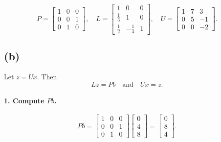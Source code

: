 \documentclass{article}
\begin{document}
$$
    \boxed{
        P =
        \begin{bmatrix}
            1 & 0 & 0 \\
            0 & 0 & 1 \\
            0 & 1 & 0
        \end{bmatrix},
        \quad
        L =
        \begin{bmatrix}
            1        & 0         & 0 \\
            \tfrac13 & 1         & 0 \\
            \tfrac12 & -\tfrac14 & 1
        \end{bmatrix},
        \quad
        U =
        \begin{bmatrix}
            1 & 7 & 3  \\
            0 & 5 & -1 \\
            0 & 0 & -2
        \end{bmatrix}
    }.
$$

\newpage
\subsection*{(b)}
Let $z = Ux$. Then
$$
    Lz = Pb \quad\text{and}\quad Ux = z.
$$

\paragraph{1. Compute $Pb$.}
$$
    Pb
    =
    \begin{bmatrix}
        1 & 0 & 0 \\
        0 & 0 & 1 \\
        0 & 1 & 0
    \end{bmatrix}
    \begin{bmatrix}0\\4\\8\end{bmatrix}
    =
    \begin{bmatrix}0\\8\\4\end{bmatrix}.
$$
\end{document}
